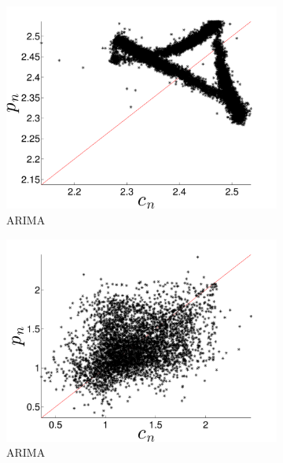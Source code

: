 \begin{figure}[htbp]
\begin{subfigure}{0.49\textwidth}
    \includegraphics[width=\textwidth]{figs/colARIMAForecast}
    \caption{\col ARIMA}
    \label{fig:colARIMA}
  \end{subfigure}
  \begin{subfigure}{0.49\textwidth}
    \includegraphics[width=\textwidth]{figs/gccARIMAForecast}
    \caption{\gcc ARIMA }
    \label{fig:gccARIMA}
  \end{subfigure}%
  \\
      \begin{subfigure}{0.49\textwidth}

\end{subfigure}
\end{figure}
